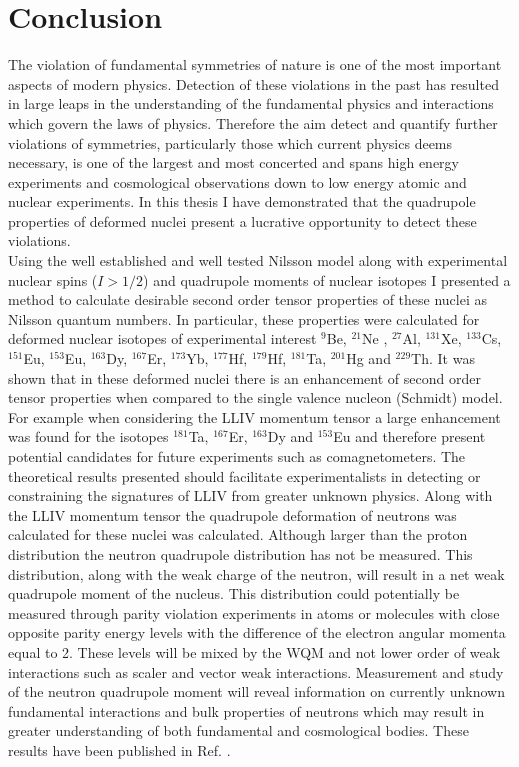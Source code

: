 \documentclass[10pt,a4paper, twoside, openright]{report}
\begin{document}
\chapter{Conclusion} \label{chap:P1Conc}
The violation of fundamental symmetries of nature is one of the most important aspects of modern physics. Detection of these violations in the past has resulted in large leaps in the understanding of the fundamental physics and interactions which govern the laws of physics. Therefore the aim detect and quantify further violations of symmetries, particularly those which current physics deems necessary, is one of the largest and most concerted and spans high energy experiments and cosmological observations down to low energy atomic and nuclear experiments. In this thesis I have demonstrated that the quadrupole properties of deformed nuclei present a lucrative opportunity to detect these violations.\\
\linebreak
Using the well established and well tested Nilsson model along with experimental nuclear spins ($I>1/2$) and quadrupole moments of nuclear isotopes I presented a method to calculate desirable second order tensor properties of these nuclei as Nilsson quantum numbers. In particular, these properties were calculated for deformed nuclear isotopes of experimental interest $^{9}$Be, $^{21}$Ne , $^{27}$Al, $^{131}$Xe, $^{133}$Cs, $^{151}$Eu, $^{153}$Eu, $^{163}$Dy, $^{167}$Er, $^{173}$Yb, $^{177}$Hf, $^{179}$Hf, $^{181}$Ta, $^{201}$Hg and $^{229}$Th. It was shown that in these deformed nuclei there is an enhancement of second order tensor properties when compared to the single valence nucleon (Schmidt) model.\\
\linebreak
For example when considering the LLIV momentum tensor a large enhancement was found for the isotopes $^{181}$Ta, $^{167}$Er, $^{163}$Dy and $^{153}$Eu and therefore present potential candidates for future experiments such as comagnetometers. The theoretical results presented should facilitate experimentalists in detecting or constraining the signatures of LLIV from greater unknown physics. Along with the LLIV momentum tensor the quadrupole deformation of neutrons was calculated for these nuclei was calculated. Although larger than the proton distribution the neutron quadrupole distribution has not be measured. This distribution, along with the weak charge of the neutron, will result in a net weak quadrupole moment of the nucleus. This distribution could potentially be measured through parity violation experiments in atoms or molecules with close opposite parity energy levels with the difference of the electron angular momenta equal to 2. These levels will be mixed by the WQM and not lower order of weak interactions such as scaler and vector weak interactions. Measurement and study of the neutron quadrupole moment will reveal information on currently unknown fundamental interactions and bulk properties of neutrons which may result in greater understanding of both fundamental and cosmological bodies. These results have been published in Ref. \cite{LFWQM2018}. \\
\end{document}
